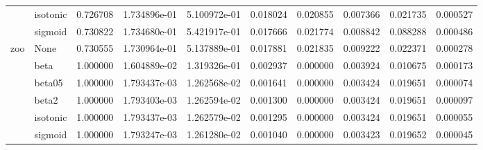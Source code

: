 \begin{tabular}{llrrrrrrrr}
        & isotonic &  0.726708 &  1.734896e-01 &  5.100972e-01 &   0.018024 &  0.020855 &  0.007366 &  0.021735 &  0.000527 \\
        & sigmoid &  0.730822 &  1.734680e-01 &  5.421917e-01 &   0.017666 &  0.021774 &  0.008842 &  0.088288 &  0.000486 \\
zoo & None &  0.730555 &  1.730964e-01 &  5.137889e-01 &   0.017881 &  0.021835 &  0.009222 &  0.022371 &  0.000278 \\
        & beta &  1.000000 &  1.604889e-02 &  1.319326e-01 &   0.002937 &  0.000000 &  0.003924 &  0.010675 &  0.000173 \\
        & beta05 &  1.000000 &  1.793437e-03 &  1.262568e-02 &   0.001641 &  0.000000 &  0.003424 &  0.019651 &  0.000074 \\
        & beta2 &  1.000000 &  1.793403e-03 &  1.262594e-02 &   0.001300 &  0.000000 &  0.003424 &  0.019651 &  0.000097 \\
        & isotonic &  1.000000 &  1.793437e-03 &  1.262579e-02 &   0.001295 &  0.000000 &  0.003424 &  0.019651 &  0.000055 \\
        & sigmoid &  1.000000 &  1.793247e-03 &  1.261280e-02 &   0.001040 &  0.000000 &  0.003423 &  0.019652 &  0.000045 \\
\bottomrule
\end{tabular}
